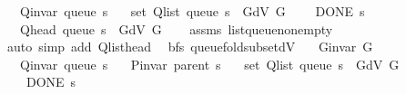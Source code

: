 \begin{isabellebody}
\ \ \ {\isachardoublequoteopen}Q{\isacharunderscore}{\kern0pt}invar\ {\isacharparenleft}{\kern0pt}queue\ s{\isacharparenright}{\kern0pt}{\isachardoublequoteclose}\isanewline
\ \ \ {\isachardoublequoteopen}set\ {\isacharparenleft}{\kern0pt}Q{\isacharunderscore}{\kern0pt}list\ {\isacharparenleft}{\kern0pt}queue\ s{\isacharparenright}{\kern0pt}{\isacharparenright}{\kern0pt}\ {\isasymsubseteq}\ G{\isachardot}{\kern0pt}dV\ G{\isachardoublequoteclose}\isanewline
\ \ \ {\isachardoublequoteopen}{\isasymnot}\ DONE\ s{\isachardoublequoteclose}\isanewline
\ \ \ {\isachardoublequoteopen}Q{\isacharunderscore}{\kern0pt}head\ {\isacharparenleft}{\kern0pt}queue\ s{\isacharparenright}{\kern0pt}\ {\isasymin}\ G{\isachardot}{\kern0pt}dV\ G{\isachardoublequoteclose}%
\endisataginvisible
{\isafoldinvisible}%
%
\isadeliminvisible
\isanewline
%
\endisadeliminvisible
%
\isadelimproof
\ \ %
\endisadelimproof
%
\isatagproof
{}\isamarkupfalse%
\ assms\ list{\isacharunderscore}{\kern0pt}queue{\isacharunderscore}{\kern0pt}non{\isacharunderscore}{\kern0pt}empty\isanewline
\ \ \isamarkupfalse%
\ {\isacharparenleft}{\kern0pt}auto\ simp\ add{\isacharcolon}{\kern0pt}\ Q{\isachardot}{\kern0pt}list{\isacharunderscore}{\kern0pt}head{\isacharparenright}{\kern0pt}%
\endisatagproof
{\isafoldproof}%
%
\isadelimproof
\isanewline
%
\endisadelimproof
%
\isadeliminvisible
\isanewline
%
\endisadeliminvisible
%
\isataginvisible
{}\isamarkupfalse%
\ {\isacharparenleft}{\kern0pt}\ bfs{\isacharparenright}{\kern0pt}\ queue{\isacharunderscore}{\kern0pt}fold{\isacharunderscore}{\kern0pt}subset{\isacharunderscore}{\kern0pt}dV{\isacharcolon}{\kern0pt}\isanewline
\ \ \ {\isachardoublequoteopen}G{\isachardot}{\kern0pt}invar\ G{\isachardoublequoteclose}\isanewline
\ \ \ {\isachardoublequoteopen}Q{\isacharunderscore}{\kern0pt}invar\ {\isacharparenleft}{\kern0pt}queue\ s{\isacharparenright}{\kern0pt}{\isachardoublequoteclose}\isanewline
\ \ \ {\isachardoublequoteopen}P{\isacharunderscore}{\kern0pt}invar\ {\isacharparenleft}{\kern0pt}parent\ s{\isacharparenright}{\kern0pt}{\isachardoublequoteclose}\isanewline
\ \ \ {\isachardoublequoteopen}set\ {\isacharparenleft}{\kern0pt}Q{\isacharunderscore}{\kern0pt}list\ {\isacharparenleft}{\kern0pt}queue\ s{\isacharparenright}{\kern0pt}{\isacharparenright}{\kern0pt}\ {\isasymsubseteq}\ G{\isachardot}{\kern0pt}dV\ G{\isachardoublequoteclose}\isanewline
\ \ \ {\isachardoublequoteopen}{\isasymnot}\ DONE\ s{\isachardoublequoteclose}\isanewline

\end{isabellebody}
